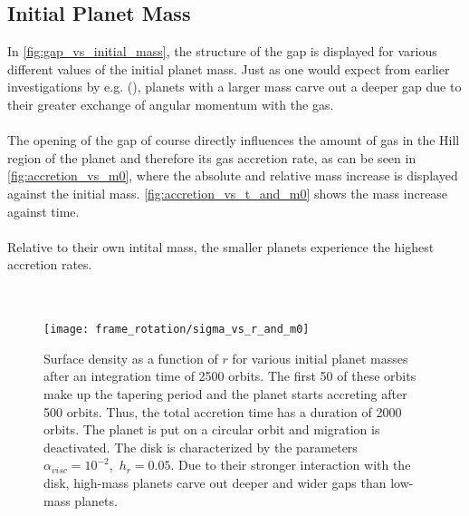     \subsection{Initial Planet Mass}
      In \autoref{fig:gap_vs_initial_mass}, the structure of the gap is 
      displayed for various different values of the initial planet mass.
      Just as one would expect from earlier investigations by e.g. 
      \citeauthor{Kley_2006} (\citeyear{Kley_2006}), planets with a larger
      mass carve out a deeper 
      gap due to their greater exchange of angular momentum with the gas. \\
      \\
      The opening of the gap of course directly influences the amount of gas in 
      the Hill region of the planet and therefore  its gas accretion rate,
      as can be seen in \autoref{fig:accretion_vs_m0}, where the absolute 
      and relative mass increase is displayed against the initial mass. 
      \autoref{fig:accretion_vs_t_and_m0} shows the mass increase against time.
      \\
      \\
      Relative to their own intital mass, the smaller planets experience 
      the highest accretion rates. \\
      \\
      \\
      
      \begin{figure}[h!]
        \centering
        \texttt{[image: frame\_rotation/sigma\_vs\_r\_and\_m0]}
        \caption{
          Surface density as a function of $r$ for various initial planet 
          masses after an integration time of 2500 
          orbits. The first 50 of these orbits make up the tapering 
          period and the planet starts accreting 
          after 500 orbits. Thus, the total accretion time has a duration of 
          2000 orbits. The planet is put on a circular orbit and migration is
          deactivated. The disk is characterized by the parameters 
          $\alpha_{visc}=10^{-2}$,\ $h_r=0.05$.
          Due to their stronger interaction with the disk, high-mass planets
          carve out deeper and wider gaps than low-mass planets.
          }
          \label{fig:gap_vs_initial_mass}
      \end{figure}

